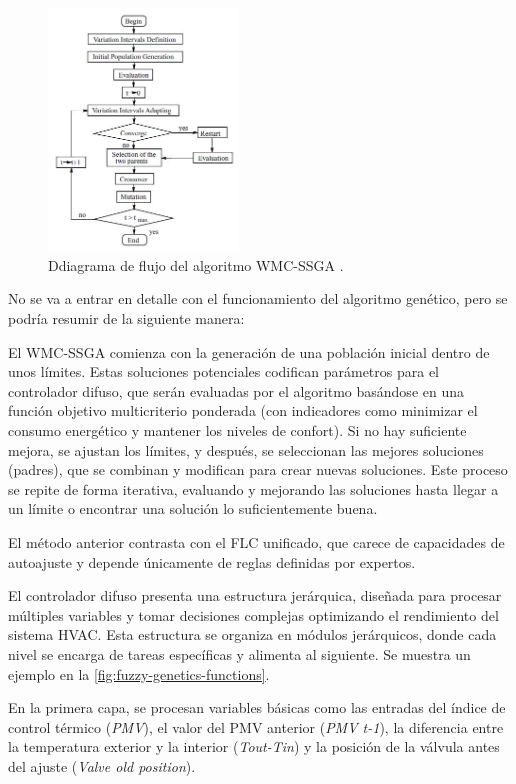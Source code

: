 \begin{figure}[H]
	\centering
	\includegraphics[width=0.45\textwidth]{imgs/flowchart-ga.JPG}
	\caption{Ddiagrama de flujo del algoritmo WMC-SSGA \parencite{alcala2003fuzzy}.}
	\label{fig:flowchart-ga}
\end{figure}

No se va a entrar en detalle con el funcionamiento del algoritmo genético, pero se podría resumir de la siguiente manera:

El WMC-SSGA comienza con la generación de una población inicial dentro de unos límites. Estas soluciones potenciales codifican parámetros para el controlador difuso, que serán evaluadas por el algoritmo basándose en una función objetivo multicriterio ponderada (con indicadores como minimizar el consumo energético y mantener los niveles de confort). Si no hay suficiente mejora, se ajustan los límites, y después, se seleccionan las mejores soluciones (padres), que se combinan y modifican para crear nuevas soluciones. Este proceso se repite de forma iterativa, evaluando y mejorando las soluciones hasta llegar a un límite o encontrar una solución lo suficientemente buena.

El método anterior contrasta con el FLC unificado, que carece de capacidades de autoajuste y depende únicamente de reglas definidas por expertos.


El controlador difuso presenta una estructura jerárquica, diseñada para procesar múltiples variables y tomar decisiones complejas optimizando el rendimiento del sistema HVAC. Esta estructura se organiza en módulos jerárquicos, donde cada nivel se encarga de tareas específicas y alimenta al siguiente. Se muestra un ejemplo en la \autoref{fig:fuzzy-genetics-functions}.

En la primera capa, se procesan variables básicas como las entradas del índice de control térmico (\textit{PMV}), el valor del PMV anterior (\textit{PMV t-1}), la diferencia entre la temperatura exterior y la interior (\textit{Tout-Tin}) y la posición de la válvula antes del ajuste (\textit{Valve old position}). 

